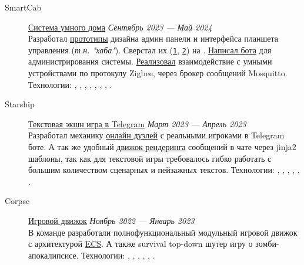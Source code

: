 \documentclass[margin,line]{resume}
\begin{document}
\begin{resume}
\begin{description}
  \item[SmartCab]\small{\href{https://github.com/smart-cab}{Система
      умного дома} \hfill
    \textsl{Сентябрь 2023 — Май 2024\vspace{1mm}}}\\
    Разработал
    \href{https://www.figma.com/design/8H1tFpxgmIDV1xp06ndi73/SmartCab?node-id=0-1&p=f}{прототипы}
    дизайна админ панели и интерфейса планшета управления
    (\textit{т.н. "хаба"}). Сверстал их
    (\texttt{\href{https://github.com/smart-cab/smartcab-hub/tree/main/frontend/src}{1}},
    \texttt{\href{https://github.com/smart-cab/smartcab-dashboard/tree/main/frontend/src}{2}})
    на .
    \href{https://github.com/smart-cab/smartcab-bot}{Написал бота}
    для администрирования системы.
    \href{https://github.com/smart-cab/smartcab-hub/blob/main/backend/smartcab/interface/mqtt.py}{Реализовал}
    взаимодействие с умными устройствами по протокулу Zigbee, через
    брокер сообщений Mosquitto.
    Технологии:
    , ,
    , ,
    ,
    , ,
    .
    \vspace{3mm}

  \item[Starship]\small{\href{https://github.com/starship-crew}{Текстовая
      экшн игра в Telegram}
    \hfill \textsl{Март 2023 — Апрель 2023\vspace{1mm}}}\\
    Разработал механику
    \href{https://github.com/starship-crew/telegram-client/blob/main/app/handlers/fight.py}{онлайн
    дуэлей} с реальными игроками в Telegram боте. А
    так же удобный
    \href{https://github.com/starship-crew/telegram-client/blob/main/app/template.py}{движок
    рендеринга}
    сообщений в чате через jinja2 шаблоны, так как для текстовой игры
    требовалось гибко работать с большим количеством сценарных и
    пейзажных текстов.
    Технологии:
    , ,
    ,
    , ,
    .

    \vspace{3mm}

  \item[Corpse]\small{\href{https://github.com/corpse-inc/corpse}{Игровой
      движок}
    \hfill \textsl{Ноябрь 2022 — Январь 2023\vspace{1mm}}}\\
    В команде разработали полнофункциональный модульный
    игровой движок с архитектурой
    \href{https://en.wikipedia.org/wiki/Entity_component_system#:~:text=Entity%E2%80%93component%E2%80%93system%20(ECS,Entity%E2%80%93Component%E2%80%93System%20layout.}{ECS}.
      А также survival top-down шутер игру о зомби-апокалипсисе.
      Технологии:
      , ,
      , , ,
      .


\end{description}
\end{resume}
\end{document}
